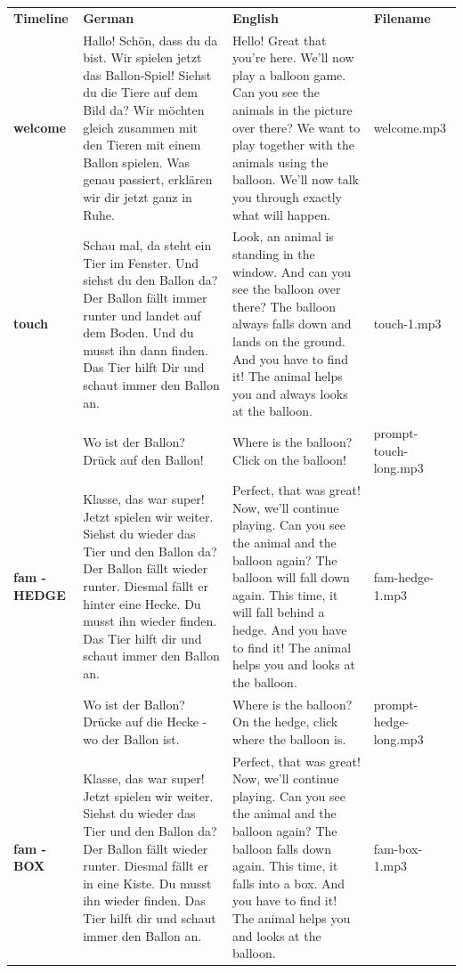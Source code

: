 \documentclass[
  man,floatsintext]{apa6}
\begin{document}
\begin{longtable}[]{@{}
  >{\raggedright\arraybackslash}p{}
  >{\raggedright\arraybackslash}p{}
  >{\raggedright\arraybackslash}p{}
  >{\raggedright\arraybackslash}p{}@{}}
\toprule\noalign{}
\endhead
\bottomrule\noalign{}
\endlastfoot
\textbf{Timeline} & \textbf{German} & \textbf{English} & \textbf{Filename} \\
\textbf{welcome} & Hallo! Schön, dass du da bist. Wir spielen jetzt das Ballon-Spiel! Siehst du die Tiere auf dem Bild da? Wir möchten gleich zusammen mit den Tieren mit einem Ballon spielen. Was genau passiert, erklären wir dir jetzt ganz in Ruhe. & Hello! Great that you're here. We'll now play a balloon game. Can you see the animals in the picture over there? We want to play together with the animals using the balloon. We'll now talk you through exactly what will happen. & welcome.mp3 \\
\textbf{touch} & Schau mal, da steht ein Tier im Fenster. Und siehst du den Ballon da? Der Ballon fällt immer runter und landet auf dem Boden. Und du musst ihn dann finden. Das Tier hilft Dir und schaut immer den Ballon an. & Look, an animal is standing in the window. And can you see the balloon over there? The balloon always falls down and lands on the ground. And you have to find it! The animal helps you and always looks at the balloon. & touch-1.mp3 \\
& Wo ist der Ballon? Drück auf den Ballon! & Where is the balloon? Click on the balloon! & prompt-touch-long.mp3 \\
\textbf{fam - HEDGE} & Klasse, das war super! Jetzt spielen wir weiter. Siehst du wieder das Tier und den Ballon da? Der Ballon fällt wieder runter. Diesmal fällt er hinter eine Hecke. Du musst ihn wieder finden. Das Tier hilft dir und schaut immer den Ballon an. & Perfect, that was great! Now, we'll continue playing. Can you see the animal and the balloon again? The balloon will fall down again. This time, it will fall behind a hedge. And you have to find it! The animal helps you and looks at the balloon. & fam-hedge-1.mp3 \\
& Wo ist der Ballon? Drücke auf die Hecke - wo der Ballon ist. & Where is the balloon? On the hedge, click where the balloon is. & prompt-hedge-long.mp3 \\
\textbf{fam - BOX} & Klasse, das war super! Jetzt spielen wir weiter. Siehst du wieder das Tier und den Ballon da? Der Ballon fällt wieder runter. Diesmal fällt er in eine Kiste. Du musst ihn wieder finden. Das Tier hilft dir und schaut immer den Ballon an. & Perfect, that was great! Now, we'll continue playing. Can you see the animal and the balloon again? The balloon falls down again. This time, it falls into a box. And you have to find it! The animal helps you and looks at the balloon. & fam-box-1.mp3 \\

\end{longtable}
\end{document}
